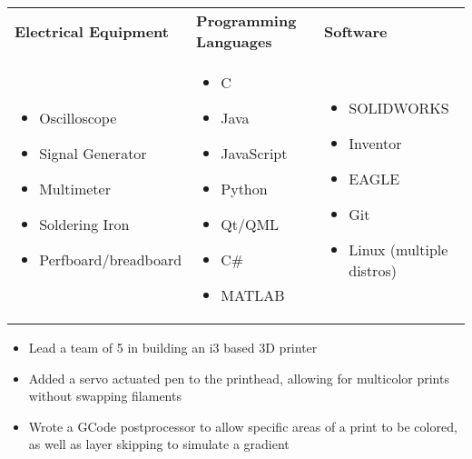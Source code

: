 \documentclass{resume}
\author{Jasper Chan}
\begin{document}
\maketitle

\TechnicalSkills
\begin{table}[H]
	\centering
	\begin{tabularx}{\textwidth}{X X X}
		\textbf{Electrical Equipment} & \textbf{Programming Languages} & \textbf{Software} \\
		\begin{itemize}
			\item Oscilloscope
			\item Signal Generator
			\item Multimeter
			\item Soldering Iron
			\item Perfboard/breadboard
		\end{itemize} & 
		\begin{itemize}
			\item C
			\item Java
			\item JavaScript
			\item Python
			\item Qt/QML
			\item C\#
			\item MATLAB
		\end{itemize} &
		\begin{itemize}
			\item SOLIDWORKS
			\item Inventor
			\item EAGLE
			\item Git
			\item Linux (multiple distros)
		\end{itemize}
	\end{tabularx}
\end{table}
\vspace{-4em} %
\CoopStatus


\TechnicalProjects

\begin{itemize}
	\item Lead a team of 5 in building an i3 based 3D printer
	\item Added a servo actuated pen to the printhead, allowing for multicolor prints without swapping filaments
	\item Wrote a GCode postprocessor to allow specific areas of a print to be colored, as well as layer skipping to simulate a gradient
\end{itemize} 
\end{document}
